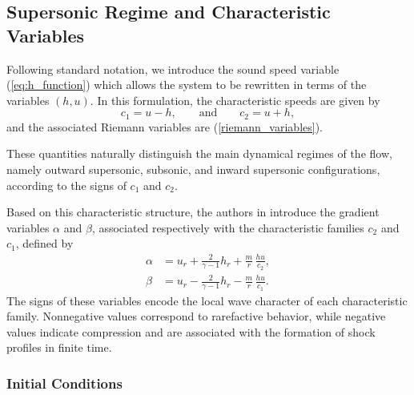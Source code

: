 \documentclass[11pt]{article}
\begin{document}
\subsection{Supersonic Regime and Characteristic Variables}

Following standard notation, we introduce the sound speed variable (\ref{eq:h_function}) which allows the system to be rewritten in terms of the variables \((h,u)\). In this formulation, the characteristic speeds are given by
\[
  c_{1} = u - h, \qquad \mbox{and} \qquad c_{2} = u + h,
\]
and the associated Riemann variables are (\ref{riemann_variables}).

These quantities naturally distinguish the main dynamical regimes of the flow, namely outward supersonic, subsonic, and inward supersonic configurations, according to the signs of \(c_1\) and \(c_2\).

Based on this characteristic structure, the authors in \cite{F1} introduce the gradient variables \(\alpha\) and \(\beta\), associated respectively with the characteristic families \(c_{2}\) and \(c_{1}\), defined by
\begin{align}
  \alpha &= u_{r} + \frac{2}{\gamma - 1}h_{r} + \frac{m}{r}\,\frac{h u}{c_{2}}, \label{eq:alpha}\\[4pt]
  \beta  &= u_{r} - \frac{2}{\gamma - 1}h_{r} - \frac{m}{r}\,\frac{h u}{c_{1}}. \label{eq:beta}
\end{align}
The signs of these variables encode the local wave character of each characteristic family. Nonnegative values correspond to rarefactive behavior, while negative values indicate compression and are associated with the formation of shock profiles in finite time.

\subsubsection{Initial Conditions}
\end{document}
